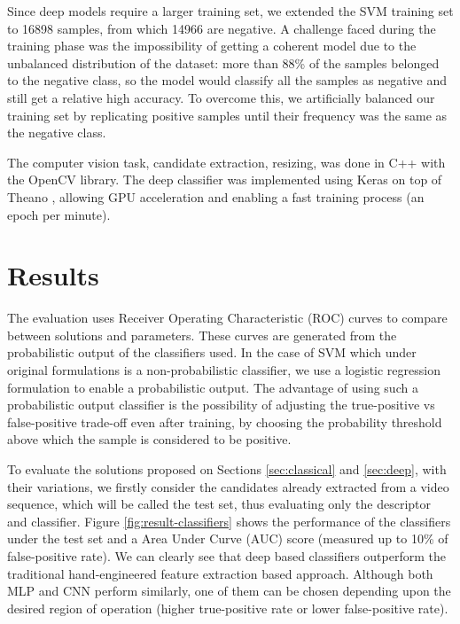         Since deep models require a larger training set, we extended the SVM training set to 16898 samples, from which 14966 are negative. A challenge faced during the training phase was the impossibility of getting a coherent model due to the unbalanced distribution of the dataset: more than 88\% of the samples belonged to the negative class, so the model would classify all the samples as negative and still get a relative high accuracy. To overcome this, we artificially balanced our training set by replicating positive samples until their frequency was the same as the negative class.

        The computer vision task, candidate extraction, resizing, was done in C++ with the OpenCV library. The deep classifier was implemented using Keras \cite{keras} on top of Theano \cite{theano}, allowing GPU acceleration and enabling a fast training process (an epoch per minute).


\section{Results}
\label{sec:results}

    The evaluation uses Receiver Operating Characteristic (ROC) curves \cite{evaluationMetrics} to compare between solutions and parameters. These curves are generated from the probabilistic output of the classifiers used. In the case of SVM which under original formulations is a non-probabilistic classifier, we use a logistic regression formulation \cite{svmProbabilisticOutput} to enable a probabilistic output. The advantage of using such a probabilistic output classifier is the possibility of adjusting the true-positive vs false-positive trade-off even after training, by choosing the probability threshold above which the sample is considered to be positive.

    To evaluate the solutions proposed on Sections \ref{sec:classical} and \ref{sec:deep}, with their variations, we firstly consider the candidates already extracted from a video sequence, which will be called the test set, thus evaluating only the descriptor and classifier. Figure \ref{fig:result-classifiers} shows the performance of the classifiers under the test set and a Area Under Curve (AUC) score \cite{evaluationMetrics} (measured up to 10\% of false-positive rate). We can clearly see that deep based classifiers outperform the traditional hand-engineered feature extraction based approach. Although both MLP and CNN perform similarly, one of them can be chosen depending upon the desired region of operation (higher true-positive rate or lower false-positive rate).

